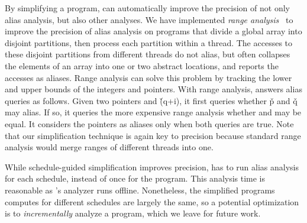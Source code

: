 By simplifying a program, \peregrine can automatically improve the precision of
not only alias analysis, but also other analyses.  We have
implemented \emph{range analysis}~\cite{range:pldi00} to improve
the precision of alias analysis on programs
that divide a global array into disjoint partitions, then process each
partition within a thread.
The accesses to these disjoint partitions from different threads do
not alias, but \bddbddb often collapses the elements of an array into one
or two abstract locations, and reports the accesses as aliases.  Range
analysis can solve this problem by tracking the lower and upper bounds of
the integers and pointers.  With range analysis, \peregrine answers alias queries
as follows.  Given two pointers
 and \v{(q+i)}, it first queries \bddbddb whether \v{p} and \v{q} may alias.
If so, it queries the more expensive range analysis whether  and
 may be equal.  It considers the pointers as aliases only when both
queries are true.  Note that our simplification technique is again key
to precision because standard range analysis would merge ranges of different threads
into one.






While schedule-guided simplification improves precision, \peregrine has to run
alias analysis for each schedule, instead of once for the program.  This
analysis time is reasonable as \peregrine's analyzer runs offline.  Nonetheless,
the simplified programs \peregrine computes for different schedules are largely
the same, so a potential optimization is to \emph{incrementally} analyze a
program, which we leave for future work.



